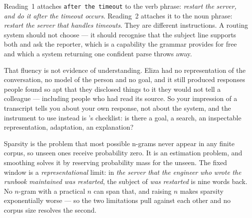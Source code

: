\begin{ans}
  \item Reading~1 attaches \texttt{after the timeout} to the verb phrase:
        \emph{restart the server, and do it after the timeout occurs}. Reading~2
        attaches it to the noun phrase: \emph{restart the server that handles
        timeouts}. They are different instructions. A routing system should not
        choose --- it should recognise that the subject line supports both and ask
        the reporter, which is a capability the grammar provides for free and which
        a system returning one confident parse throws away.
  \item That fluency is not evidence of understanding. Eliza had no representation
        of the conversation, no model of the person and no goal, and it still
        produced responses people found so apt that they disclosed things to it they
        would not tell a colleague --- including people who had read its source. So
        your impression of a transcript tells you about your own response, not about
        the system, and the instrument to use instead is
        's checklist: is there a goal, a search, an inspectable
        representation, adaptation, an explanation?
  \item Sparsity is the problem that most possible n-grams never appear in any
        finite corpus, so unseen ones receive probability zero. It is an estimation
        problem, and smoothing solves it by reserving probability mass for the
        unseen. The fixed window is a \emph{representational} limit: in
        \emph{the server that the engineer who wrote the runbook maintained was
        restarted}, the subject of \emph{was restarted} is nine words back. No
        $n$-gram with a practical $n$ can span that, and raising $n$ makes sparsity
        exponentially worse --- so the two limitations pull against each other and
        no corpus size resolves the second.
\end{ans}


